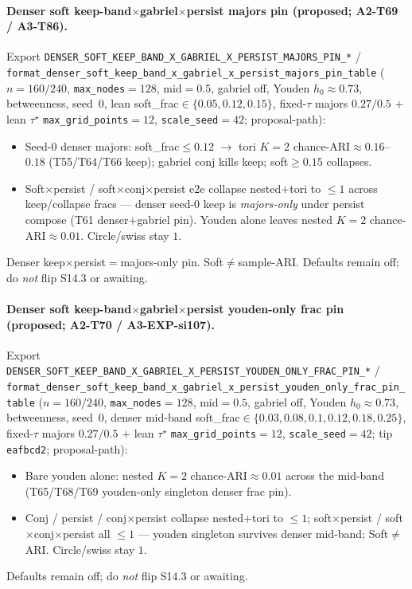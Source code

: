 \documentclass[11pt]{article}
\begin{document}
\paragraph{Denser soft keep-band$\times$gabriel$\times$persist majors pin
(proposed; A2-T69 / A3-T86).}
Export \texttt{DENSER\_SOFT\_KEEP\_BAND\_X\_GABRIEL\_X\_PERSIST\_MAJORS\_PIN\_*} /
\texttt{format\_denser\_soft\_keep\_band\_x\_gabriel\_x\_persist\_majors\_pin\_table}
($n{=}160/240$, \texttt{max\_nodes}${=}128$, mid${=}0.5$, gabriel off,
Youden $h_0\approx 0.73$, betweenness, seed~$0$, lean
soft\_frac$\in\{0.05,0.12,0.15\}$, fixed-$\tau$ majors $0.27/0.5$ $+$ lean
$\tau^\star$ \texttt{max\_grid\_points}${=}12$,
\texttt{scale\_seed}${=}42$; proposal-path):
\begin{itemize}[leftmargin=1.5em]
  \item Seed-$0$ denser majors: soft\_frac$\le 0.12$ $\to$ tori $K{=}2$
  chance-ARI$\approx 0.16$--$0.18$ (T55/T64/T66 keep); gabriel conj kills
  keep; soft$\ge 0.15$ collapses.
  \item Soft$\times$persist / soft$\times$conj$\times$persist e2e collapse
  nested$+$tori to $\le 1$ across keep/collapse fracs --- denser seed-$0$
  keep is \emph{majors-only} under persist compose (T61 denser$+$gabriel
  pin). Youden alone leaves nested $K{=}2$ chance-ARI$\approx 0.01$.
  Circle/swiss stay $1$.
\end{itemize}
Denser keep$\times$persist${=}$majors-only pin. Soft$\neq$sample-ARI.
Defaults remain off; do \emph{not} flip S14.3 or awaiting.

\paragraph{Denser soft keep-band$\times$gabriel$\times$persist youden-only
frac pin (proposed; A2-T70 / A3-EXP-si107).}
Export
\texttt{DENSER\_SOFT\_KEEP\_BAND\_X\_GABRIEL\_X\_PERSIST\_YOUDEN\_ONLY\_FRAC\_PIN\_*} /
\texttt{format\_denser\_soft\_keep\_band\_x\_gabriel\_x\_persist\_youden\_only\_frac\_pin\_table}
($n{=}160/240$, \texttt{max\_nodes}${=}128$, mid${=}0.5$, gabriel off,
Youden $h_0\approx 0.73$, betweenness, seed~$0$, denser mid-band
soft\_frac$\in\{0.03,0.08,0.1,0.12,0.18,0.25\}$, fixed-$\tau$ majors
$0.27/0.5$ $+$ lean $\tau^\star$ \texttt{max\_grid\_points}${=}12$,
\texttt{scale\_seed}${=}42$; tip \texttt{eafbcd2}; proposal-path):
\begin{itemize}[leftmargin=1.5em]
  \item Bare youden alone: nested $K{=}2$ chance-ARI$\approx 0.01$ across
  the mid-band (T65/T68/T69 youden-only singleton denser frac pin).
  \item Conj / persist / conj$\times$persist collapse nested$+$tori to
  $\le 1$; soft$\times$persist / soft$\times$conj$\times$persist all
  $\le 1$ --- youden singleton survives denser mid-band; Soft$\neq$ARI.
  Circle/swiss stay $1$.
\end{itemize}
Defaults remain off; do \emph{not} flip S14.3 or awaiting.
\end{document}
